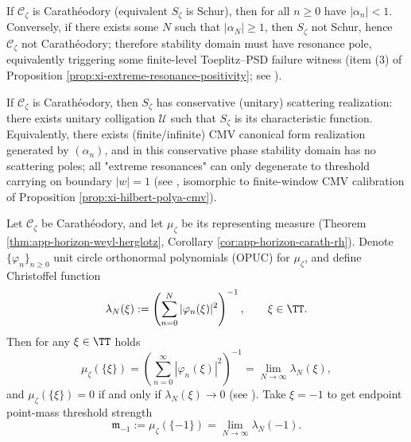 \begin{theorem}\label{thm:xi-horizon-reflection-finite-witness}
If \(\mathscr{C}_{\zeta}\) is Carathéodory (equivalent \(S_{\zeta}\) is Schur), then for all \(n\ge 0\) have \(|\alpha_n|<1\).
Conversely, if there exists some \(N\) such that \(|\alpha_N|\ge 1\), then \(S_{\zeta}\) not Schur, hence \(\mathscr{C}_{\zeta}\) not Carathéodory;
therefore stability domain must have resonance pole, equivalently triggering some finite-level Toeplitz--PSD failure witness (item (3) of Proposition \ref{prop:xi-extreme-resonance-positivity}; see \cite{Simon2005OPUC1}).
\end{theorem}

\begin{theorem}\label{thm:xi-horizon-conservative-realization}
If \(\mathscr{C}_{\zeta}\) is Carathéodory, then \(S_{\zeta}\) has conservative (unitary) scattering realization: there exists unitary colligation \(\mathcal U\) such that \(S_{\zeta}\) is its characteristic function.
Equivalently, there exists (finite/infinite) CMV canonical form realization generated by \((\alpha_n)\), and in this conservative phase stability domain has no scattering poles; all "extreme resonances" can only degenerate to threshold carrying on boundary \(|w|=1\) (see \cite{CanteroMoralVelazquez2003CMV,Simon2005OPUC1}, isomorphic to finite-window CMV calibration of Proposition \ref{prop:xi-hilbert-polya-cmv}).
\end{theorem}

\begin{theorem}\label{thm:xi-horizon-endpoint-atom-christoffel}
Let \(\mathscr{C}_{\zeta}\) be Carathéodory, and let \(\mu_{\zeta}\) be its representing measure (Theorem \ref{thm:app-horizon-weyl-herglotz}, Corollary \ref{cor:app-horizon-carath-rh}).
Denote \(\{\varphi_n\}_{n\ge 0}\) unit circle orthonormal polynomials (OPUC) for \(\mu_{\zeta}\), and define Christoffel function
\[
\lambda_N(\xi):=\left(\sum_{n=0}^{N}|\varphi_n(\xi)|^2\right)^{-1},\qquad \xi\in\TT.
\]
Then for any \(\xi\in\TT\) holds
\[
\mu_{\zeta}(\{\xi\})
=\left(\sum_{n=0}^{\infty}|\varphi_n(\xi)|^2\right)^{-1}
=\lim_{N\to\infty}\lambda_N(\xi),
\]
and \(\mu_{\zeta}(\{\xi\})=0\) if and only if \(\lambda_N(\xi)\to 0\) (see \cite{Simon2005OPUC1}).
Take \(\xi=-1\) to get endpoint point-mass threshold strength
\[
\mathfrak m_{-1}:=\mu_{\zeta}(\{-1\})=\lim_{N\to\infty}\lambda_N(-1).
\]
\end{theorem}

